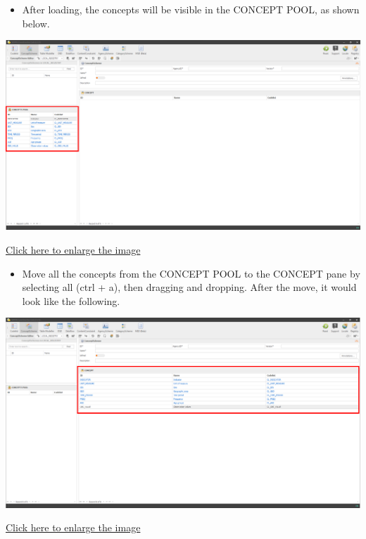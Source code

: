 \documentclass[
]{book}
\providecommand{\tightlist}{%
  \setlength{\itemsep}{0pt}\setlength{\parskip}{0pt}}
\theoremstyle{definition}
\theoremstyle{definition}
\theoremstyle{definition}
\theoremstyle{definition}
\theoremstyle{remark}
\begin{document}
\begin{itemize}
\tightlist
\item
  After loading, the concepts will be visible in the CONCEPT POOL, as shown below.
\end{itemize}

\begin{center}\includegraphics[width=1\linewidth]{./images/image112} \end{center}

\href{images/image112.png}{Click here to enlarge the image}

\begin{itemize}
\tightlist
\item
  Move all the concepts from the CONCEPT POOL to the CONCEPT pane by selecting all (ctrl + a), then dragging and dropping. After the move, it would look like the following.
\end{itemize}

\begin{center}\includegraphics[width=1\linewidth]{./images/image114} \end{center}

\href{images/image114.png}{Click here to enlarge the image}
\end{document}

